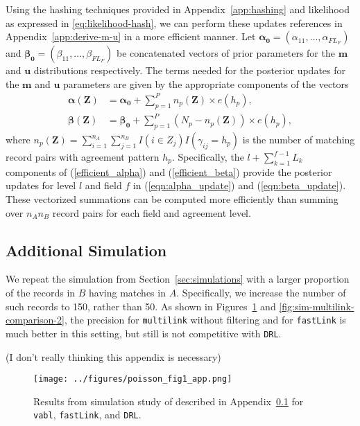 \documentclass[12pt,letterpaper]{article}
\newcommand{\1}[1]{\mathbb{I}\!\left[#1\right]} %
\def \brian#1{{\color{red} (#1)}}
\begin{document}
Using the hashing techniques provided in Appendix~\ref{app:hashing} and likelihood as expressed in \eqref{eq:likelihood-hash}, we can perform these updates references in Appendix~\ref{app:derive-m-u} in a more efficient manner. Let $\bm{\alpha_0} = (\alpha_{11}, \ldots, \alpha_{F L_F})$ and $\bm{\beta_0}= (\beta_{11}, \ldots, \beta_{F L_F})$ be concatenated vectors of prior parameters for the $\bm{m}$ and $\bm{u}$ distributions respectively. The terms needed for the posterior updates for the $\bm{m}$ and $\bm{u}$ parameters are given by the appropriate components of the vectors
\begin{align}
	\bm{\alpha(\bm{Z})} &= \bm{\alpha_0} + \sum_{p=1}^P n_p\left(\bm{Z} \right) \times e(h_p), \label{efficient_alpha} \\
	\bm{\beta(\bm{Z})} &= \bm{\beta_0} + \sum_{p=1}^P \left(N_p - n_p\left(\bm{Z}\right)\right) \times e(h_p), \label{efficient_beta}
\end{align}
where $n_p(\bm{Z}) = \sum_{i = 1}^{n_A}\sum_{j = 1}^{n_B} I(i \in Z_{j}) I\left(\gamma_{ij} = h_p \right)$ is the number of matching record pairs with agreement pattern $h_p$. Specifically, the $l + \sum_{k=1}^{f-1} L_k$ components of (\ref{efficient_alpha}) and (\ref{efficient_beta}) provide the posterior updates for level $l$ and field $f$ in (\ref{eqn:alpha_update}) and (\ref{eqn:beta_update}). These vectorized summations can be computed more efficiently than summing over $n_A n_B$ record pairs for each field and agreement level.

\subsection{Additional Simulation}\label{app:simulation-2}

We repeat the simulation from Section~\ref{sec:simulations} with a larger proportion of the records in $B$ having matches in $A$. Specifically, we increase the number of such records to 150, rather than 50. As shown in Figures~\ref{fig:sim-vabl-comparison-2} and \ref{fig:sim-multilink-comparison-2}, the precision for \texttt{multilink} without filtering and for \texttt{fastLink} is much better in this setting, but still is not competitive with \texttt{DRL}. 

\brian{I don't really thinking this appendix is necessary}

\begin{figure}[t]
	\centering
	\texttt{[image: ../figures/poisson\_fig1\_app.png]}
	\caption{Results from simulation study of described in Appendix~\ref{app:simulation-2} for \texttt{vabl}, \texttt{fastLink}, and \texttt{DRL}.}
	\label{fig:sim-vabl-comparison-2}
\end{figure}
\end{document}
